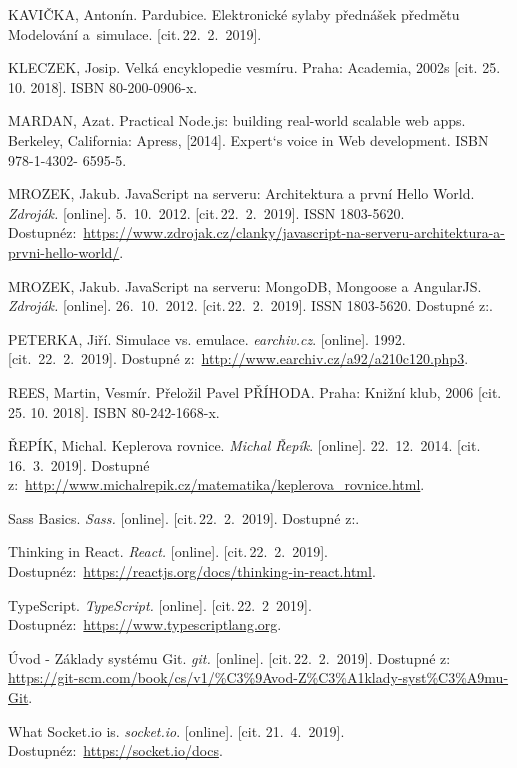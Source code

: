 \documentclass[a4paper,12pt]{article}
\begin{document}
\begin{thebibliography}{99}
KAVIČKA, Antonín. Pardubice. Elektronické sylaby přednášek předmětu Modelování a~simulace. [cit.\,22.~2.~2019].

KLECZEK, Josip. Velká encyklopedie vesmíru. Praha: Academia, 2002s [cit. 25. 10. 2018]. ISBN 80-200-0906-x.

MARDAN, Azat. Practical Node.js: building real-world scalable web apps. Berkeley, California: Apress, [2014]. Expert‘s voice in Web development. ISBN 978-1-4302- 6595-5.

MROZEK, Jakub. JavaScript na serveru: Architektura a první Hello World.
\textit{Zdroják.} [online]. 5.~10.~2012. [cit.\,22.~2.~2019].  ISSN 1803-5620.
Dostupné\newline z:~{\ttfamily \url{https://www.zdrojak.cz/clanky/javascript-na-serveru-architektura-a-prvni-hello-world/}}.

MROZEK, Jakub. JavaScript na serveru: MongoDB, Mongoose a AngularJS.
\textit{Zdroják.} [online]. 26.~10.~2012. [cit.\,22.~2.~2019]. ISSN 1803-5620.
Dostupné z:.

PETERKA, Jiří. Simulace vs. emulace. \textit{earchiv.cz}. [online]. 1992. [cit.~22.~2.~2019]. Dostupné z:~{\ttfamily\url{http://www.earchiv.cz/a92/a210c120.php3}}.

REES, Martin, Vesmír. Přeložil Pavel PŘÍHODA. Praha: Knižní klub, 2006 [cit. 25. 10. 2018]. ISBN 80-242-1668-x.

ŘEPÍK, Michal. Keplerova rovnice. \textit{Michal Řepík}. [online]. 22.~12.~2014. [cit. 16.~3.~2019]. Dostupné z:~{\ttfamily\url{http://www.michalrepik.cz/matematika/keplerova_rovnice.html}}.

Sass Basics.
\textit{Sass.} [online]. [cit.\,22.~2.~2019].
Dostupné z:.

Thinking in React.
\textit{React.} [online]. [cit.\,22.~2.~2019]. 
Dostupné\newline z:~{\ttfamily \url{https://reactjs.org/docs/thinking-in-react.html}}.

TypeScript. 
\textit{TypeScript.} [online]. [cit.\,22.~2~2019]. 
Dostupné\newline z:~{\ttfamily \url{https://www.typescriptlang.org}}.

Úvod - Základy systému Git.
\textit{git.} [online]. [cit.\,22.~2.~2019]. 
Dostupné z: {\ttfamily \url{https://git-scm.com/book/cs/v1/%C3%9Avod-Z%C3%A1klady-syst%C3%A9mu-Git}}.

What Socket.io is. \textit{socket.io}. [online]. [cit. 21.~4.~2019]. Dostupné\newline z:~{\ttfamily \url{https://socket.io/docs}}.

\end{thebibliography}
\end{document}
